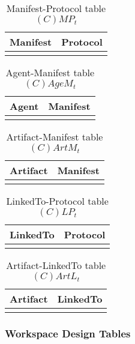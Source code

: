 \begin{table}[H]
	\centering
	\begin{tabular}{|p{4cm}|p{8cm}|}
			\hline
			\textbf{Manifest} & \textbf{Protocol} \\
			\hline
			& \\
			\hline
		\end{tabular}
	\caption{Manifest-Protocol table $(C)MP_t$}
	\label{tab:cmpt}
\end{table}

\begin{table}[H]
	\centering
	\begin{tabular}{|p{4cm}|p{8cm}|}
			\hline
			\textbf{Agent} & \textbf{Manifest} \\
			\hline
			& \\
			\hline
		\end{tabular}
	\caption{Agent-Manifest table $(C)AgeM_t$}
	\label{tab:cagemt}
\end{table}

\begin{table}[H]
	\centering
	\begin{tabular}{|p{4cm}|p{8cm}|}
			\hline
			\textbf{Artifact} & \textbf{Manifest} \\
			\hline
			& \\
			\hline
		\end{tabular}
	\caption{Artifact-Manifest table $(C)ArtM_t$}
	\label{tab:cartmt}
\end{table}

\begin{table}[H]
	\centering
	\begin{tabular}{|p{4cm}|p{8cm}|}
			\hline
			\textbf{LinkedTo} & \textbf{Protocol} \\
			\hline
			& \\
			\hline
		\end{tabular}
	\caption{LinkedTo-Protocol table $(C)LP_t$}
	\label{tab:clpt}
\end{table}

\begin{table}[H]
	\centering
	\begin{tabular}{|p{4cm}|p{8cm}|}
			\hline
			\textbf{Artifact} & \textbf{LinkedTo} \\
			\hline
			& \\
			\hline
		\end{tabular}
	\caption{Artifact-LinkedTo table $(C)ArtL_t$}
	\label{tab:cartlt}
\end{table}

\subsubsection{Workspace Design Tables}

